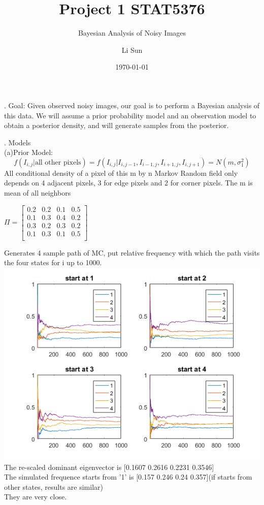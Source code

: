 \documentclass[11pt]{scrartcl}
\begin{document}
\title{Project 1 STAT5376}
\subtitle{Bayesian Analysis of Noisy Images}
\author{Li Sun}
\date{\today}
\maketitle

. Goal: Given observed noisy images, our goal is to perform a Bayesian analysis of this data. We will assume a prior probability model and an observation model to obtain a posterior density, and will generate samples from the posterior.

\bigskip

. Models\\
(a)Prior Model: \\
$$f(I_{i,j}|\text{all other pixels})=f(I_{i,j}|I_{i,j-1},I_{i-1,j},I_{i+1,j},I_{i,j+1})=N(m,\sigma^2_1)$$
All conditional density of a pixel of this m by n Markov Random field only depends on 4 adjacent pixels, 3 for edge pixels and 2 for corner pixels. The m is mean of all neighbors\\

\begin{center}
$
\Pi =
\begin{bmatrix}
0.2&0.2&0.1&0.5\\
0.1&0.3&0.4&0.2\\
0.3&0.2&0.3&0.2\\
0.1&0.3&0.1&0.5\\
\end{bmatrix}
$
\end{center} 
Generates 4 sample path of MC, put relative frequency with which the path visits the four states for i up to 1000.\\
\includegraphics[scale=1]{hw2p1.png}
The re-scaled dominant eigenvector is [0.1607 0.2616 0.2231 0.3546]\\
The simulated frequence starts from '1' is [0.157 0.246 0.24 0.357](if starts from other states, results are similar)\\ 
They are very close.\\
\end{document}
